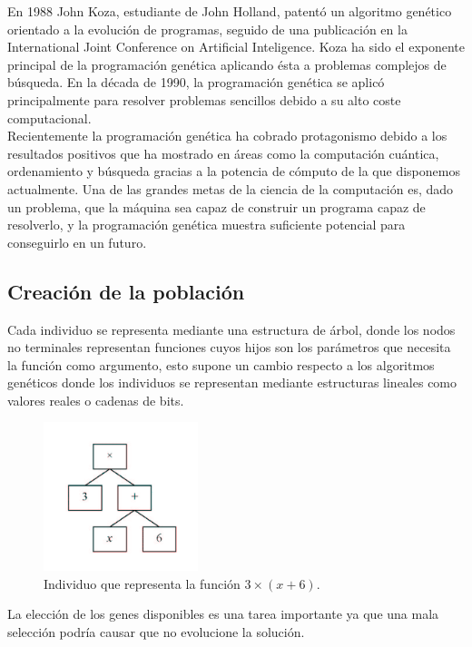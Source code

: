 \documentclass[12pt]{article} \usepackage[utf8x]{inputenc}
\begin{document}
En 1988 John Koza, estudiante de John Holland, patentó un algoritmo
genético orientado a la evolución de programas, seguido de una
publicación en la International Joint Conference on Artificial
Inteligence. Koza ha sido el exponente principal de la programación
genética aplicando ésta a problemas complejos de búsqueda.
En la década de 1990, la programación genética se aplicó 
principalmente para resolver problemas sencillos debido a su alto 
coste computacional.\\

Recientemente la programación genética ha cobrado protagonismo debido 
a los resultados positivos que ha mostrado en áreas como la computación
cuántica, ordenamiento y búsqueda gracias a la potencia de cómputo de
la que disponemos actualmente. Una de las grandes metas de la ciencia 
de la computación es, dado un problema, que la máquina sea capaz de
construir un programa capaz de resolverlo, y la programación genética
muestra suficiente potencial para conseguirlo en un futuro.\\


\subsection {Creación de la población}

Cada individuo se representa mediante una estructura de árbol, donde 
los nodos no terminales representan funciones cuyos hijos son los 
parámetros que necesita la función como argumento, esto supone un
cambio respecto a los algoritmos genéticos donde los individuos se
representan mediante estructuras lineales como valores reales o
cadenas de bits.

\begin{figure}[H]
  \centering
  \includegraphics[width=0.4\textwidth]{individuo.PNG}
  \caption{Individuo que representa la función \(3\times(x+6)\).}
  \label{fig:dfd:1}
\end{figure}


La elección de los genes disponibles es una tarea importante 
ya que una mala selección podría causar que no evolucione 
la solución.\\
\end{document}
